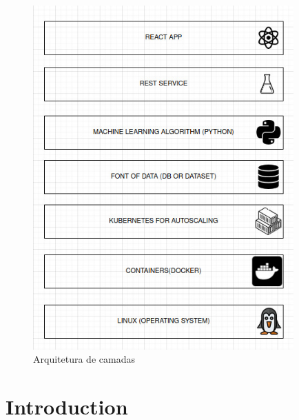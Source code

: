 \begin{figure}
    \centering
    \includegraphics[width=10cm]{assets/index.jpg}
    \caption{Arquitetura de camadas}
    \label{Arquitetura de camadas}
    \end{figure}
\section{Introduction}
